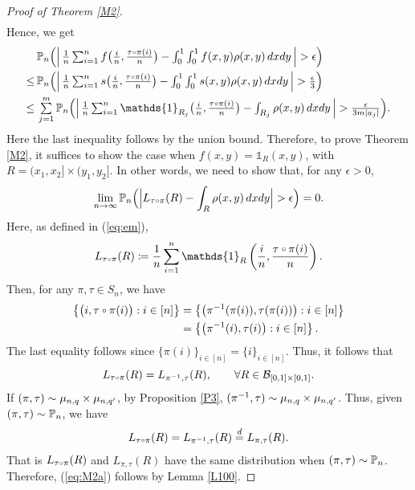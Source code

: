 \begin{proof}[Proof of Theorem \ref{M2}]
\begin{align*}
\end{align*}
Hence, we get
\begin{align*}
 &\textstyle \p_n\Big(\Big|\, \frac{1}{n}\sum_{i=1}^{n}f\big(\frac{i}{n}, \frac{\tau \ccirc \pi(i)}{n}\big) -
  \int_0^1\int_0^1 f(x, y) \rho(x, y)\,dxdy\, \Big| > \epsilon \Big)\\
 \le\, &\textstyle\p_n\Big(\Big|\, \frac{1}{n}\sum_{i=1}^{n}s\big(\frac{i}{n}, \frac{\tau \ccirc \pi(i)}{n}\big) -
    \int_0^1\int_0^1 s(x, y) \rho(x, y)\,dxdy \, \Big| > \frac{\epsilon}{3} \Big)\\
 \le\, &\textstyle\sum\limits_{j = 1}^{m} \p_n\Big(\Big|\, \frac{1}{n}\sum_{i=1}^{n}\mathds{1}_{R_j}\big(\frac{i}{n}, \frac{\tau \ccirc \pi(i)}{n}\big) -
    \int_{R_j} \rho(x, y)\,dxdy \, \Big| > \frac{\epsilon}{3 m |a_j|} \Big).
\end{align*}
Here the last inequality follows by the union bound. Therefore, to prove Theorem \ref{M2}, it suffices to show the case when $f(x, y) = \mathds{1}_R(x, y)$, with $R = (x_1, x_2]\times(y_1, y_2]$. In other words, we need to show that, for any $\epsilon > 0$,
\begin{equation}
\lim_{n \to \infty} \p_n \Big(\Big|L_{\tau \ccirc \pi}(R) - \int_{R}\rho(x, y)\, dxdy \Big| > \epsilon \Big) = 0.   \label{eq:M2a}
\end{equation}
Here, as defined in (\ref{eq:em}),
\[
L_{\tau \ccirc \pi}(R) \coloneqq \frac{1}{n}\sum_{i = 1}^{n} \mathds{1}_R\left( \frac{i}{n}, \frac{\tau \ccirc \pi(i)}{n} \right).
\]
Then, for any $\pi, \tau \in S_n$, we have
\begin{align*}
\left\{\big( i, \tau \ccirc \pi(i) \big) : i \in [n] \right\} &= \left\{\big(\pi^{-1}(\pi(i)), \tau(\pi(i)) \big) : i \in [n] \right\} \\
                                                   &= \left\{\big( \pi^{-1}(i), \tau(i) \big) : i \in [n] \right\}.
\end{align*}
The last equality follows since $\{\pi(i)\}_{i \in [n]} = \{i\}_{i \in [n]}$.
Thus, it follows that
\[
L_{\tau \ccirc \pi}(R) = L_{\pi^{-1}, \tau}(R), \qquad \forall R \in  \mathcal{B}_{[0, 1]\times[0,1]}.
\]
If $(\pi, \tau) \sim \mu_{n, q} \times \mu_{n, q'}$, by Proposition \ref{P3}, $(\pi^{-1}, \tau) \sim \mu_{n, q} \times \mu_{n, q'}$.
Thus, given $(\pi, \tau) \sim \mathbb{P}_n$, we have
\[
L_{\tau \ccirc \pi}(R) = L_{\pi^{-1}, \tau}(R) \overset{d}{=} L_{\pi, \tau}(R).
\]
That is $L_{\tau \ccirc \pi}(R)$ and $L_{\pi, \tau}(R)$ have the same distribution when $(\pi, \tau) \sim \mathbb{P}_n$.\\
Therefore, (\ref{eq:M2a}) follows by Lemma \ref{L100}.

\end{proof}






